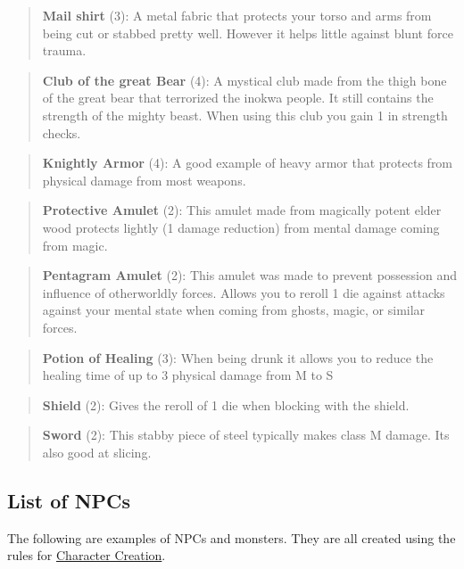 \documentclass[11pt]{article}
\begin{document}
{\begin{quote}
\textbf{Mail shirt} (3): A metal fabric that protects your torso and arms from being cut or stabbed pretty well. However it helps little against blunt force trauma.
\end{quote}

\begin{quote}
\textbf{Club of the great Bear} (4): A mystical club made from the thigh bone of the great bear that terrorized the inokwa people. It still contains the strength of the mighty beast. When using this club you gain 1 in strength checks.
\end{quote}

\begin{quote}
\textbf{Knightly Armor} (4): A good example of heavy armor that protects from physical damage from most weapons.
\end{quote}

\begin{quote}
\textbf{Protective Amulet} (2): This amulet made from magically potent elder wood protects lightly (1 damage reduction) from mental damage coming from magic.
\end{quote}

\begin{quote}
\textbf{Pentagram Amulet} (2): This amulet was made to prevent possession and influence of otherworldly forces. Allows you to reroll 1 die against attacks against your mental state when coming from ghosts, magic, or similar forces.
\end{quote}

\begin{quote}
\textbf{Potion of Healing} (3): When being drunk it allows you to reduce the healing time of up to 3 physical damage from M to S
\end{quote}

\begin{quote}
\textbf{Shield} (2): Gives the reroll of 1 die when blocking with the shield.
\end{quote}

\begin{quote}
\textbf{Sword} (2): This stabby piece of steel typically makes class M damage. Its also good at slicing.
\end{quote}


\subsection{List of NPCs}
\label{sec:orga89017f}
The following are examples of NPCs and monsters. They are all created using the rules for \hyperref[sec:orgb6d437b]{Character Creation}. 

}
\end{document}
